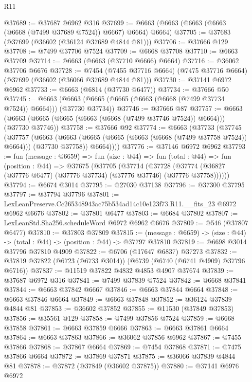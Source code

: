 \begin{lexlean}{R11}
\begin{coremodule}
@37689 := @37687 @6962 @316
@37699 := @6663 (@6663 (@6663 (@6663 (@6668 (@7499 @37689 @7524)) @6667) @6664) @6664)
@37705 := @37683 (@37699 (@36602 (@36124 @37689 @4844 @81)))
@37706 := @37666 @129
@37708 := @7499 @37706 @7524
@37709 := @6668 @37708
@37710 := @6663 @37709
@37714 := @6663 (@6663 (@37710 @6666) @6664)
@37716 := @36062 @37706 @6676
@37728 := @7454
    (@7455 @37716 @6664)
    (@7475 @37716 @6664)
    (@37699 (@36602 (@36066 @37689 @4844 @81)))
@37730 := @37141 @6972 @6962
@37733 := @6663 (@6814 (@37730 @6477))
@37734 := @37666 @50
@37745 := @6663 (@6663 (@6665 (@6665 (@6663 (@6668 (@7499 @37734 @7524)) @6664))) (@37730 @37734))
@37746 := @37666 @87
@37757 := @6663 (@6663 (@6665 (@6665 (@6663 (@6668 (@7499 @37746 @7524)) @6664))) (@37730 @37746))
@37758 := @37666 @92
@37774 := @6663
    (@37733
      (@37745
        (@37757
          (@6663
            (@6663 (@6665 (@6665 (@6663 (@6668 (@7499 @37758 @7524)) @6664))) (@37730 @37758))
            @6664))))
@37776 := @37146 @6972 @6962
@37793 := fun (message : @6659) =>
  fun (size : @44) =>
  fun (total : @44) =>
  fun (position : @44) =>
  @37675
    (@37705
      (@37714
        (@37728 (@37774 (@36827 (@37776 @6477) (@37776 @37734) (@37776 @37746) (@37776 @37758))))))
@37794 := @6674 @3014
@37795 := @27030 @37138
@37796 := @37300 @37795
@37797 := @37794 @37796
@37801 := LexLeanPreserve.Cc265348943ac75b534ad14c10e123f73.R11.__fits_23 @6972 @6962 @6676
@37802 := @37801 @6477
@37803 := @6684 @37802
@37807 := LexLeanStd.Sha256.scheduleWord @6972 @6962 @6676
@37809 := @546 (@37807 @6477)
@37810 := @37803 @37809
@37815 := (message : @6659) -> (size : @44) -> (total : @44) -> (position : @44) -> @37797 @37810
@37819 := @6698 @3014 @37796 @37810 @4909
@37822 := @6706 (@17647 @6837) @37273
@37832 := @37819 @37822 (@6723 (@6733 @3014)) (@6739 (@6740 (@6741 @4909) @37796 @6716))
@37837 := @11519 @37822 @4832 @4853 @4907 @37674
@37839 := @37687 @6972 @316
@37841 := @7499 @37839 @7524
@37842 := @6668 @37841
@37844 := @6663 @37842 @6667
@37846 := @6663 @37844 @6664
@37848 := @6663 @37846 @6664
@37849 := @6663 @37848
@37852 := @36124 @37839 @4844 @81
@37853 := @36602 @37852
@37855 := @11530 (@37849 @37853)
@37856 := @35561 @129
@37858 := @7499 @37856 @7524
@37859 := @6668 @37858
@37861 := @6663 @37859 @6666
@37863 := @6663 @37861 @6664
@37864 := @6663 @37863
@37866 := @36062 @37856 @6962
@37867 := @7455 @37866
@37868 := @37867 @6664
@37869 := @7454 @37868
@37871 := @7475 @37866 @6664
@37872 := @37869 @37871
@37875 := @36066 @37839 @4844 @81
@37878 := @37872 (@37849 (@36602 @37875))
@37880 := @37141 @6976 @6972

\end{coremodule}
\end{lexlean}
